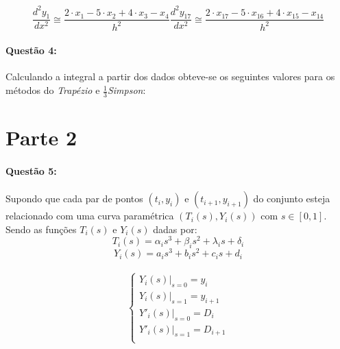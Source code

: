 \documentclass[a4paper,11pt]{article}
\begin{document}
\begin{subequations}
\begin{equation}
\frac{d^2y_1}{dx^2} \cong \frac{2\cdot x_1 -5\cdot x_2 +4\cdot x_3 -x_4}{h^2}
\end{equation}

\begin{equation}
\frac{d^2y_{17}}{dx^2} \cong \frac{2\cdot x_{17} -5\cdot x_{16} +4\cdot x_{15} -x_{14}}{h^2}
\end{equation}
\end{subequations}



\paragraph{Questão 4:}Calculando a integral a partir dos dados obteve-se os seguintes valores para os métodos do \textit{Trapézio} e $\frac{1}{3}$\textit{Simpson}:

\section{Parte 2}
\paragraph{Questão 5:}Supondo que cada par de pontos $(t_i,y_i)$  e $(t_{i+1},y_{i+1})$ do conjunto esteja relacionado com uma curva paramétrica $(T_i(s),Y_i(s))$ com $s \in [0,1]$. Sendo as funções $T_i(s)$ e $Y_i(s)$ dadas por:
\begin{equation}\label{eq:spline.Ti}
  T_i(s) = \alpha_i s^3 + \beta_i s^2 + \lambda_i s + \delta_i
\end{equation}
\begin{equation}\label{eq:spline.Yi}
  Y_i(s) = a_i s^3 + b_i s^2 + c_i s + d_i
\end{equation}
\paragraph{}%
\begin{equation}
\left\{
\begin{array}{l}
\left.Y_i(s)\right|_{s=0} = y_i \\
\left.Y_i(s)\right|_{s=1} = y_{i+1} \\
\left.Y'_i(s)\right|_{s=0} = D_i \\
\left.Y'_i(s)\right|_{s=1} = D_{i+1} \\
\end{array}
\right.
\end{equation}
\end{document}
